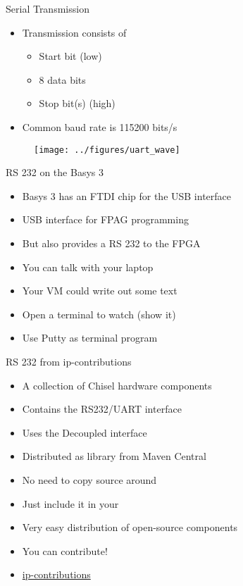 \begin{frame}[fragile]{Serial Transmission}
\begin{itemize}
\item Transmission consists of
\begin{itemize}
\item Start bit (low)
\item 8 data bits
\item Stop bit(s) (high)
\end{itemize}
\item Common baud rate is 115200 bits/s
\end{itemize}
\begin{figure}
  \texttt{[image: ../figures/uart\_wave]}
\end{figure}
\end{frame}


\begin{frame}[fragile]{RS 232 on the Basys 3}
\begin{itemize}
\item Basys 3 has an FTDI chip for the USB interface
\item USB interface for FPAG programming
\item But also provides a RS 232 to the FPGA
\item You can talk with your laptop
\item Your VM could write out some text
\item Open a terminal to watch (show it)
\item Use Putty as terminal program
\end{itemize}
\end{frame}

\begin{frame}[fragile]{RS 232 from ip-contributions}
\begin{itemize}
\item A collection of Chisel hardware components
\item Contains the RS232/UART interface
\item Uses the Decoupled interface
\item Distributed as library from Maven Central
\item No need to copy source around
\item Just include it in your 
\item Very easy distribution of open-source components
\item You can contribute!
\item \href{https://github.com/freechipsproject/ip-contributions}{ip-contributions}
\end{itemize}
\end{frame}


